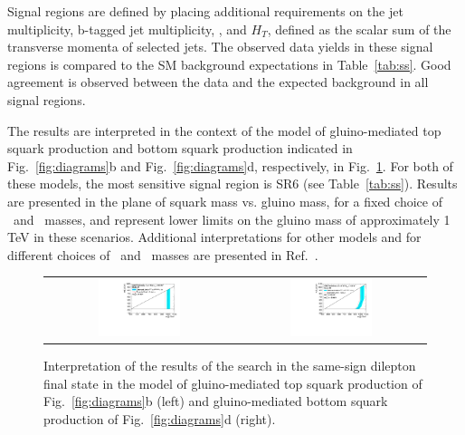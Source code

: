 Signal regions are defined by placing additional requirements on the jet multiplicity, b-tagged jet multiplicity, \met, and $H_T$, defined as the scalar 
sum of the transverse momenta of selected jets. The observed data yields in these signal regions is compared to the SM background expectations in 
Table~\ref{tab:ss}. Good agreement is observed between the data and the expected background in all signal regions.

The results are interpreted in the context of the model of gluino-mediated top squark production and bottom squark production indicated in 
Fig.~\ref{fig:diagrams}b and Fig.~\ref{fig:diagrams}d, respectively, in Fig.~\ref{fig:ss_interpretation}. 
For both of these models, the most sensitive signal region is SR6 (see Table~\ref{tab:ss}).
Results are presented in the plane
of squark mass vs. gluino mass, for a fixed choice of \lsp\ and \chip\ masses, and represent lower limits on the gluino mass of approximately 1 TeV in these scenarios.
Additional interpretations for other models and for different choices of \lsp\ and \chip\ masses are presented in Ref.~\cite{ref:ss}.

\begin{figure}
\centering
\begin{tabular}{cc}
\includegraphics[width=0.45\textwidth]{HCPPlots/SS_A2.pdf} &
\includegraphics[width=0.45\textwidth]{HCPPlots/SS_B2.pdf} \\
\end{tabular}
\caption{
Interpretation of the results of the search in the same-sign dilepton final state in the model of gluino-mediated top squark production
of Fig.~\ref{fig:diagrams}b (left) and gluino-mediated bottom squark production of Fig.~\ref{fig:diagrams}d (right).
\label{fig:ss_interpretation}
}
\end{figure}


